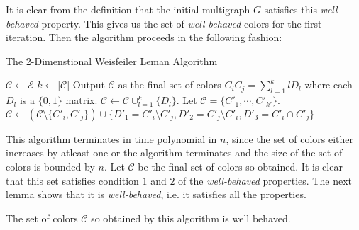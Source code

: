  
 It is clear from the definition that the initial multigraph $G$ satisfies this \emph{well-behaved} property. This gives us the set of \emph{well-behaved} colors for the first iteration. Then the algorithm proceeds in the following
 fashion:

 \begin{algorithm}[H]
	 \caption{The 2-Dimenstional Weisfeiler Leman Algorithm}\label{wl}
 \begin{algorithmic}
     \State $\mathcal{C} \leftarrow \mathcal{E}$
     \State $k \leftarrow |\mathcal{C}|$
     \State Output $\mathcal{C}$ as the final set of colors
	 \Else 
	         \State $C_iC_j=\sum_{l=1}^k lD_l$ where each $D_l$ is a $\{0,1\}$ matrix.
		 \State $\mathcal{C} \leftarrow \mathcal{C} \cup_{l=1}^k \{D_l\}$. Let $\mathcal{C} = \{C'_1,\cdots,C'_{k'}\}$.
		 \State $\mathcal{C} \leftarrow (\mathcal{C}\setminus \{C'_i,C'_j\}) \cup \{D'_1=C'_i\setminus C'_j,D'_2=C'_j\setminus C'_i,D'_3=C'_i \cap C'_j\}$
		 \EndWhile
	\EndIf
     \EndWhile
 \end{algorithmic}
\end{algorithm}

This algorithm terminates in time polynomial in $n$, since the set of colors either increases by atleast one or the algorithm terminates and the size of the set of colors is bounded by $n$.
Let $\mathcal{C}$ be the final set of colors so obtained. It is clear that this set satisfies condition $1$ and $2$ of the \emph{well-behaved} properties. The next lemma shows that it is \emph{well-behaved}, 
 i.e. it satisfies all the properties.

 
 \begin{lemma}\label{wellbehaved}
	 The set of colors $\mathcal{C}$ so obtained by this algorithm is well behaved.
\end{lemma}


